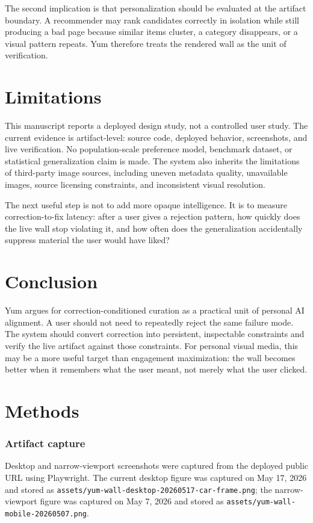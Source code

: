 \documentclass[12pt,letterpaper]{article}
\newcommand{\backmattersection}[1]{\section*{#1}\markboth{#1}{}}
\begin{document}
The second implication is that personalization should be evaluated at the artifact boundary. A recommender may rank candidates correctly in isolation while still producing a bad page because similar items cluster, a category disappears, or a visual pattern repeats. Yum therefore treats the rendered wall as the unit of verification.

\section{Limitations}

This manuscript reports a deployed design study, not a controlled user study. The current evidence is artifact-level: source code, deployed behavior, screenshots, and live verification. No population-scale preference model, benchmark dataset, or statistical generalization claim is made. The system also inherits the limitations of third-party image sources, including uneven metadata quality, unavailable images, source licensing constraints, and inconsistent visual resolution.

The next useful step is not to add more opaque intelligence. It is to measure correction-to-fix latency: after a user gives a rejection pattern, how quickly does the live wall stop violating it, and how often does the generalization accidentally suppress material the user would have liked?

\section{Conclusion}

Yum argues for correction-conditioned curation as a practical unit of personal AI alignment. A user should not need to repeatedly reject the same failure mode. The system should convert correction into persistent, inspectable constraints and verify the live artifact against those constraints. For personal visual media, this may be a more useful target than engagement maximization: the wall becomes better when it remembers what the user meant, not merely what the user clicked.

\printbibliography

\backmattersection{Methods}

\subsubsection*{Artifact capture}

Desktop and narrow-viewport screenshots were captured from the deployed public URL using Playwright. The current desktop figure was captured on May 17, 2026 and stored as \texttt{assets/yum-wall-desktop-20260517-car-frame.png}; the narrow-viewport figure was captured on May 7, 2026 and stored as \texttt{assets/yum-wall-mobile-20260507.png}.
\end{document}

